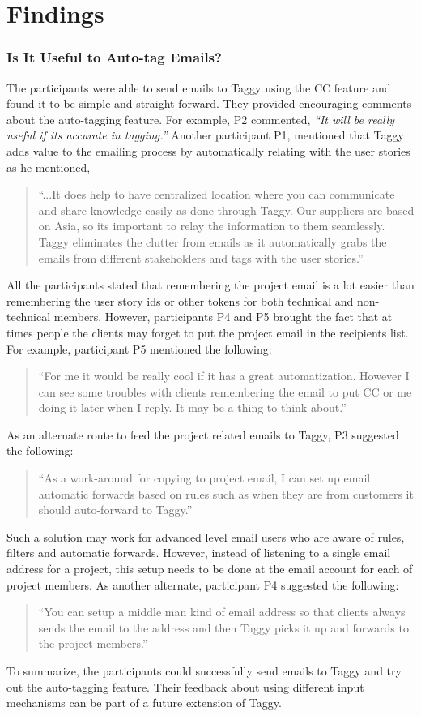 \section{Findings}

\subsubsection{Is It Useful to Auto-tag Emails?}
The participants were able to send emails to Taggy using the CC feature and found it to be simple and straight forward. They provided encouraging comments about the auto-tagging feature. For example, P2 commented, \emph{``It will be really useful if its accurate in tagging.''} Another participant P1, mentioned that Taggy adds value to the emailing process by automatically relating with the user stories as he mentioned, 
\begin{quote}
``...It does help to have centralized location where you can communicate and share knowledge easily as done through Taggy. Our suppliers are based on Asia, so its important to relay the information to them seamlessly. Taggy eliminates the clutter from emails as it automatically grabs the emails from different stakeholders and tags with the user stories.''	
\end{quote}

All the participants stated that remembering the project email is a lot easier than remembering the user story ids or other tokens for both technical and non-technical members. However, participants P4 and P5 brought the fact that at times people the clients may forget to put the project email in the recipients list. For example, participant P5 mentioned the following:
\begin{quote}
 ``For me it would be really cool if it has a great automatization. However I can see some troubles with clients remembering the email to put CC or me doing it later when I reply. It may be a thing to think about.''
\end{quote}
As an alternate route to feed the project related emails to Taggy, P3 suggested the following:
\begin{quote}
	``As a work-around for copying to project email, I can set up email automatic forwards based on rules such as when they are from customers it should auto-forward to Taggy.'' 
\end{quote}
Such a solution may work for advanced level email users who are aware of rules, filters and automatic forwards. However, instead of listening to a single email address for a project, this setup needs to be done at the email account for each of project members. As another alternate, participant P4 suggested the following:
\begin{quote}
	``You can setup a middle man kind of email address so that clients always sends the email to the address and then Taggy picks it up and forwards to the project members.''
\end{quote}
To summarize, the participants could successfully send emails to Taggy and try out the auto-tagging feature. Their feedback about using different input mechanisms can be part of a future extension of Taggy.

